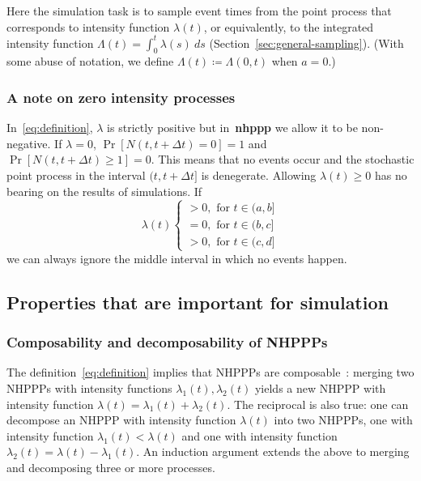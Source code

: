 \documentclass[10pt,letterpaper]{article}
\newcommand{\pkg}[1]{{\bf #1}}
\begin{document}
Here the simulation task is to sample event times from the point process that corresponds to intensity function $\lambda(t)$, or equivalently, to the integrated intensity function $\Lambda(t) = \int_0^t \lambda(s) \ ds$ (Section~\ref{sec:general-sampling}).
(With some abuse of notation, we define $\Lambda(t) \coloneqq \Lambda(0, t)$ when  $a=0$.)

\subsubsection{A note on zero intensity processes}
In~\eqref{eq:definition}, $\lambda$ is strictly positive but in~\pkg{nhppp} we allow it to be non-negative. If $\lambda = 0$, ${\Pr[N(t, t + \Delta t) = 0] = 1}$ and ${\Pr[N(t, t + \Delta t) \ge 1] = 0}$. This means that no events occur and the stochastic point process in the interval $(t, t + \Delta t]$ is denegerate. Allowing $\lambda(t) \ge 0$ has no bearing on the results of simulations. If
\begin{equation*}
    \lambda(t)  \begin{cases}
    >0, \text{ for } t \in (a, b] \\
    =0, \text{ for } t \in (b, c] \\
    >0, \text{ for } t \in (c, d]
    \end{cases}
\end{equation*}
we can always ignore the middle interval in which no events happen.

\subsection{Properties that are important for simulation}\label{sec:properties}
\subsubsection{Composability and decomposability of NHPPPs}
The definition~\eqref{eq:definition} implies that NHPPPs are composable~\cite[par. 4.2]{cox1965theory}: merging two NHPPPs with intensity functions $\lambda_1(t), \lambda_2(t)$ yields a new NHPPP with intensity function $\lambda(t) = \lambda_1(t) + \lambda_2(t)$. The reciprocal is also true: one can decompose an NHPPP with intensity function $\lambda(t)$ into two NHPPPs, one with intensity function $\lambda_1(t) < \lambda(t)$ and one with intensity function ${\lambda_2(t) = \lambda(t)-\lambda_1(t)}$. An induction argument extends the above to merging and decomposing three or more processes.
\end{document}
